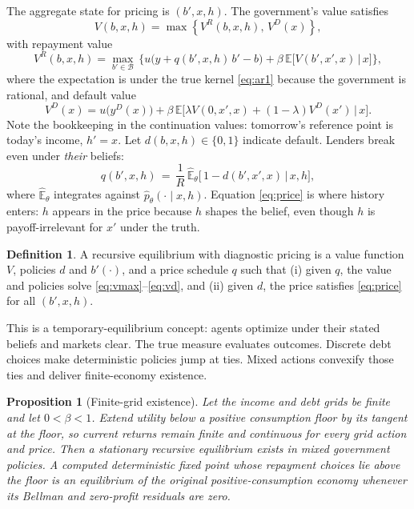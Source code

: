 \documentclass[11pt]{article}
\newtheorem{proposition}{Proposition}
\theoremstyle{definition}
\newtheorem{definition}{Definition}
\newcommand{\E}{\mathbb{E}}
\newcommand{\Ehat}{\widehat{\E}}
\begin{document}
The aggregate state for pricing is $(b', x, h)$. The government's value satisfies
\begin{equation}
V(b, x, h) = \max\left\{ V^R(b, x, h),\, V^D(x) \right\},
\label{eq:vmax}
\end{equation}
with repayment value
\begin{equation}
V^R(b, x, h) = \max_{b' \in \mathcal{B}} \,\Big\{ u\big(y + q(b', x, h)\, b' - b\big) + \beta \,\E\big[ V(b', x', x) \,\big|\, x \big] \Big\},
\label{eq:vr}
\end{equation}
where the expectation is under the true kernel \eqref{eq:ar1} because the government is rational, and default value
\begin{equation}
V^D(x) = u\big(y^D(x)\big) + \beta\, \E\big[ \lambda V(0, x', x) + (1 - \lambda) V^D(x') \,\big|\, x \big].
\label{eq:vd}
\end{equation}
Note the bookkeeping in the continuation values: tomorrow's reference point is today's income, $h' = x$. Let $d(b, x, h) \in \{0, 1\}$ indicate default. Lenders break even under \emph{their} beliefs:
\begin{equation}
q(b', x, h) \,=\, \frac{1}{R}\, \Ehat_\theta\big[\, 1 - d(b', x', x) \,\big|\, x, h \big],
\label{eq:price}
\end{equation}
where $\Ehat_\theta$ integrates against $\hat p_\theta(\cdot \mid x, h)$. Equation \eqref{eq:price} is where history enters: $h$ appears in the price because $h$ shapes the belief, even though $h$ is payoff-irrelevant for $x'$ under the truth.

\begin{definition}\label{def:eqm}
A recursive equilibrium with diagnostic pricing is a value function $V$, policies $d$ and $b'(\cdot)$, and a price schedule $q$ such that (i) given $q$, the value and policies solve \eqref{eq:vmax}--\eqref{eq:vd}, and (ii) given $d$, the price satisfies \eqref{eq:price} for all $(b', x, h)$.
\end{definition}

This is a temporary-equilibrium concept: agents optimize under their stated beliefs and markets clear. The true measure evaluates outcomes. Discrete debt choices make deterministic policies jump at ties. Mixed actions convexify those ties and deliver finite-economy existence.

\begin{proposition}[Finite-grid existence]\label{prop:existence}
Let the income and debt grids be finite and let $0<\beta<1$. Extend utility below a positive consumption floor by its tangent at the floor, so current returns remain finite and continuous for every grid action and price. Then a stationary recursive equilibrium exists in mixed government policies. A computed deterministic fixed point whose repayment choices lie above the floor is an equilibrium of the original positive-consumption economy whenever its Bellman and zero-profit residuals are zero.
\end{proposition}
\end{document}
